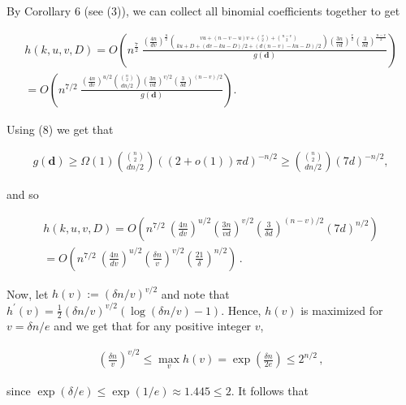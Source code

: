 \documentclass[10pt,a4paper]{article}
\begin{document}
By Corollary 6 (see (3)), we can collect all binomial coefficients together to get\par


\[\begin{gathered}
\displaystyle h(k,u,v,D) \displaystyle= \displaystyle O\left(n^{\frac{7}{2}}\ \frac{\left(\frac{4n}{dv}\right)^{\frac{u}{2}}\binom{vu+(n-v-u)v+{v\choose 2}+{n-v\choose 2}}{ku+D+(dv-ku-D)/2+(d(n-v)-ku-D)/2}\left(\frac{3n}{vd}\right)^{\frac{v}{2}}\left(\frac{3}{\delta d}\right)^{\frac{n-v}{2}}}{g(\mathbf{d})}\right) \\
\displaystyle= \displaystyle O\left(n^{7/2}\ \frac{\left(\frac{4n}{dv}\right)^{u/2}\binom{{n\choose 2}}{dn/2}\left(\frac{3n}{vd}\right)^{v/2}\left(\frac{3}{\delta d}\right)^{(n-v)/2}}{g(\mathbf{d})}\right).
\end{gathered}\]


Using (8) we get that\par


\[\begin{gathered}
g(\mathbf{d})\geq\Omega(1)\binom{{n\choose 2}}{dn/2}((2+o(1))\pi d)^{-n/2}\geq\binom{{n\choose 2}}{dn/2}(7d)^{-n/2},
\end{gathered}\]


and so\par


\[\begin{gathered}
\displaystyle h(k,u,v,D) \displaystyle= \displaystyle O\left(n^{7/2}\ \left(\frac{4n}{dv}\right)^{u/2}\left(\frac{3n}{vd}\right)^{v/2}\left(\frac{3}{\delta d}\right)^{(n-v)/2}(7d)^{n/2}\right) \\
\displaystyle= \displaystyle O\left(n^{7/2}\ \left(\frac{4n}{dv}\right)^{u/2}\left(\frac{\delta n}{v}\right)^{v/2}\left(\frac{21}{\delta}\right)^{n/2}\right)\,.
\end{gathered}\]


Now, let $h(v):=(\delta n/v)^{v/2}$ and note that $h^{\prime}(v)=\frac{1}{2}(\delta n/v)^{v/2}(\log(\delta n/v)-1)$. Hence, $h(v)$ is maximized for $v=\delta n/e$ and we get that for any positive integer $v$,\par


\[\begin{gathered}
\left(\frac{\delta n}{v}\right)^{v/2}\leq\max_{v}h(v)=\exp\left(\frac{\delta n}{2e}\right)\leq 2^{n/2}\,,
\end{gathered}\]


since $\exp(\delta/e)\leq\exp(1/e)\approx 1.445\leq 2$. It follows that\par
\end{document}
